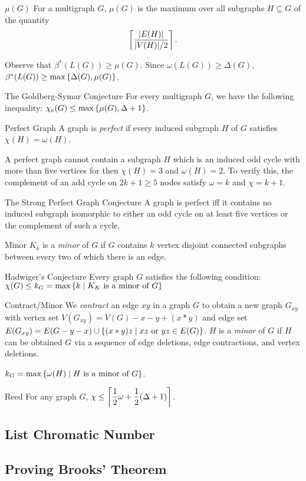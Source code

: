 \begin{df}{$\mu(G)$}
	For a multigraph $G$, $\mu(G)$ is the maximum over all subgraphs $H\subseteq G$ of the quantity \[\left\lceil \dfrac{\qty|E(H)|}{\qty|V(H)|/2} \right\rceil.\]
\end{df}
\begin{rmk}
	Observe that $\beta^*(L(G))\geq\mu(G)$. Since $\omega(L(G))\geq\Delta(G),$ $\beta^*(L(G))\geq\max\qty{\Delta(G),\mu(G)}$.	
\end{rmk}
\begin{conj}{The Goldberg-Symar Conjecture}
	For every multigraph $G$, we have the following inequality: $\chi_e(G)\leq\max\qty{\mu(G),\Delta+1}$.
\end{conj}
\begin{df}{Perfect Graph}
	A graph is \textit{perfect} if every induced subgraph $H$ of $G$ satisfies $\chi(H)=\omega(H)$. 
\end{df}
\begin{rmk}
	A perfect graph cannot contain a subgraph $H$ which is an induced odd cycle with more than five vertices for then $\chi(H)=3$ and $\omega(H)=2$. To verify this, the complement of an add cycle on $2k+1\geq5$ nodes satisfy $\omega=k$ and $\chi=k+1$.
\end{rmk}
\begin{conj}{The Strong Perfect Graph Conjecture}
	A graph is perfect iff it contains no induced subgraph isomorphic to either an odd cycle on at least five vertices or the complement of such a cycle. 	
\end{conj}
\begin{df}{Minor}
	$K_k$ is a \textit{minor} of $G$ if $G$ contains $k$ vertex disjoint connected subgraphs between every two of which there is an edge.	
\end{df}
\begin{conj}{Hadwiger's Conjecture}
	Every graph $G$ satisfies the following condition: $\chi(G)\leq k_G=\max\qty{k\mid K_K\text{ is a minor of }G}$
\end{conj}
\begin{df}{Contract/Minor}
	We \textit{contract} an edge $xy$ in a graph $G$ to obtain a new graph $G_{xy}$ with vertex set $V(G_{xy})=V(G)-x-y+(x*y)$ and edge set $E(G_{xy})=E(G-y-x)\cup\qty{(x*y)z\mid xz\text{ or }yz\in E(G)}$. $H$ is a \textit{minor} of $G$ if $H$ can be obtained $G$ via a sequence of edge deletions, edge contractions, and vertex deletions.	
\end{df}
\begin{rmk}
	$k_G=\max\qty{\omega(H)\mid H\text{ is a minor of }G}$.	
\end{rmk}
\begin{conj}{Reed}
	For any graph $G$, $\chi\leq\left\lceil \dfrac{1}{2}\omega+\dfrac{1}{2}(\Delta+1) \right\rceil$.
	
\end{conj}





\subsection{List Chromatic Number}
\subsection{Proving Brooks' Theorem}\label{sec:provingBrook}